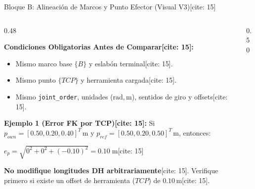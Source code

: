 \documentclass[aspectratio=169, xcolor={table,xcdraw}]{beamer}
\begin{document}
\begin{frame}{Bloque B: Alineación de Marcos y Punto Efector (Visual V3)[cite: 15]}
    \begin{columns}[T]
        \begin{column}{0.48\textwidth}
            \scriptsize\raggedright
            \textbf{Condiciones Obligatorias Antes de Comparar[cite: 15]:}
            \begin{itemize}\setlength{\itemsep}{1pt}
                \item Mismo marco base $\{B\}$ y eslabón terminal[cite: 15].
                \item Mismo punto $\{TCP\}$ y herramienta cargada[cite: 15].
                \item Mismo \texttt{joint\_order}, unidades ($\mathrm{rad}, \mathrm{m}$), sentidos de giro y offsets[cite: 15].
            \end{itemize}
            \vspace{0.1cm}
            \begin{tcolorbox}[colback=yellow!10, colframe=orange, boxsep=0.8mm, top=1mm, bottom=1mm]
                \scriptsize\raggedright
                \textbf{Ejemplo 1 (Error FK por TCP)[cite: 15]:} Si $p_{own}=[0.50, 0.20, 0.40]^T\,\mathrm{m}$ y $p_{ref}=[0.50, 0.20, 0.50]^T\,\mathrm{m}$, entonces:
                \begin{center}
                    $\boxed{e_p = \sqrt{0^2+0^2+(-0.10)^2} = 0.10\;\mathrm{m}}$[cite: 15]
                \end{center}
                \textbf{No modifique longitudes DH arbitrariamente}[cite: 15]. Verifique primero si existe un offset de herramienta ($TCP$) de $0.10\,\mathrm{m}$[cite: 15].
            \end{tcolorbox}
        \end{column}
        \begin{column}{0.50\textwidth}
            \centering
\end{column}
\end{columns}
\end{frame}
\end{document}
